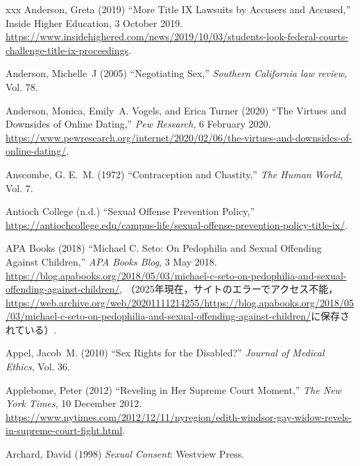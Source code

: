 \documentclass[]{jlreq} \usepackage{mystyle}
\begin{document}
\begin{thebibliography}{xxx}
Anderson, Greta (2019) ``More Title IX Lawsuits by Accusers and Accused,''
  Inside Higher Education, 3 October 2019.
  \url{https://www.insidehighered.com/news/2019/10/03/students-look-federal-courts-challenge-title-ix-proceedings}.

Anderson, Michelle~J (2005) ``Negotiating Sex,'' \textit{ Southern California
  law review}, Vol. 78.

Anderson, Monica, Emily~A. Vogels, and Erica Turner (2020) ``The Virtues and
  Downsides of Online Dating,'' \emph{Pew Research}, 6 February 2020.
  \url{https://www.pewresearch.org/internet/2020/02/06/the-virtues-and-downsides-of-online-dating/}.

Anscombe, G. E.~M. (1972) ``Contraception and Chastity,'' \textit{ The Human
  World}, Vol. 7.

{Antioch College} (n.d.) ``Sexual Offense Prevention Policy,''
  \url{https://antiochcollege.edu/campus-life/sexual-offense-prevention-policy-title-ix/}.

{APA Books} (2018) ``Michael C. Seto: On Pedophilia and Sexual Offending
  Against Children,'' \emph{APA Books Blog}, 3 May 2018.
  \url{https://blog.apabooks.org/2018/05/03/michael-c-seto-on-pedophilia-and-sexual-offending-against-children/},
  （2025年現在，サイトのエラーでアクセス不能，\url{https://web.archive.org/web/20201111214255/https://blog.apabooks.org/2018/05/03/michael-c-seto-on-pedophilia-and-sexual-offending-against-children/}に保存されている）.

Appel, Jacob~M. (2010) ``Sex Rights for the Disabled?'' \textit{ Journal of
  Medical Ethics}, Vol. 36.

Applebome, Peter (2012) ``Reveling in Her Supreme Court Moment,'' \emph{The New
  York Times}, 10 December 2012.
  \url{https://www.nytimes.com/2012/12/11/nyregion/edith-windsor-gay-widow-revels-in-supreme-court-fight.html}.

Archard, David (1998)  \textit{ Sexual Consent}: Westview Press.


\end{thebibliography}
\end{document}

